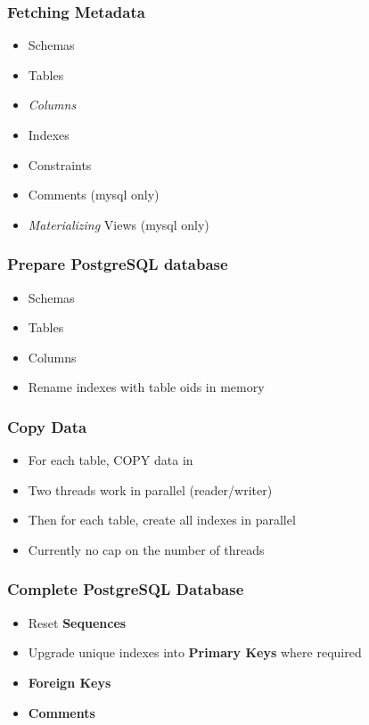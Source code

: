\documentclass{beamer}
\begin{document}
\begin{frame}
  \frametitle{Fetching Metadata}

  \vfill

  \begin{itemize}
  \item Schemas
  \item Tables
  \item \textit{Columns}
  \item Indexes
  \item Constraints
  \item Comments (mysql only)
  \item \textit{Materializing} Views (mysql only)
  \end{itemize}
\end{frame}

\begin{frame}
  \frametitle{Prepare PostgreSQL database}

  \vfill

  \begin{itemize}
  \item Schemas
  \item Tables
  \item Columns
  \item Rename indexes with table oids in memory
  \end{itemize}
\end{frame}

\begin{frame}
  \frametitle{Copy Data}

  \vfill

  \begin{itemize}
  \item For each table, COPY data in
  \item Two threads work in parallel (reader/writer)
  \item Then for each table, create all indexes in parallel
  \item Currently no cap on the number of threads
  \end{itemize}
\end{frame}

\begin{frame}
  \frametitle{Complete PostgreSQL Database}

  \vfill

  \begin{itemize}
  \item Reset \textbf{Sequences}
  \item Upgrade unique indexes into \textbf{Primary Keys} where required
  \item \textbf{Foreign Keys}
  \item \textbf{Comments}
  \end{itemize}
\end{frame}
\end{document}

